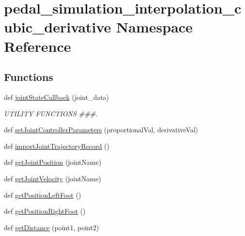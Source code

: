 \hypertarget{namespacepedal__simulation__interpolation__cubic__derivative}{}\section{pedal\+\_\+simulation\+\_\+interpolation\+\_\+cubic\+\_\+derivative Namespace Reference}
\label{namespacepedal__simulation__interpolation__cubic__derivative}
\subsection*{Functions}
\begin{DoxyCompactItemize}
\item 
def \mbox{\hyperlink{namespacepedal__simulation__interpolation__cubic__derivative_a8ba7e664349c21ee2d4c3b9ed4444863}{joint\+State\+Callback}} (joint\+\_\+data)
\begin{DoxyCompactList}\small\item\em U\+T\+I\+L\+I\+TY F\+U\+N\+C\+T\+I\+O\+NS \#\#\#. \end{DoxyCompactList}\item 
def \mbox{\hyperlink{namespacepedal__simulation__interpolation__cubic__derivative_a14a03067c9be857e5286ea14d3ea5e95}{set\+Joint\+Controller\+Parameters}} (proportional\+Val, derivative\+Val)
\item 
def \mbox{\hyperlink{namespacepedal__simulation__interpolation__cubic__derivative_a76e080940025a1563491de2d9879590c}{import\+Joint\+Trajectory\+Record}} ()
\item 
def \mbox{\hyperlink{namespacepedal__simulation__interpolation__cubic__derivative_a315fe4c5bd2622f2d56a0fc6c3c5e143}{get\+Joint\+Position}} (joint\+Name)
\item 
def \mbox{\hyperlink{namespacepedal__simulation__interpolation__cubic__derivative_a24deb6472cb7522ba7982e8b0d12a4cf}{get\+Joint\+Velocity}} (joint\+Name)
\item 
def \mbox{\hyperlink{namespacepedal__simulation__interpolation__cubic__derivative_af5b9d5c7d073c5699b72c7e341bccc95}{get\+Position\+Left\+Foot}} ()
\item 
def \mbox{\hyperlink{namespacepedal__simulation__interpolation__cubic__derivative_a9053f001263fc33a7c91b58ad1cab5ee}{get\+Position\+Right\+Foot}} ()
\item 
def \mbox{\hyperlink{namespacepedal__simulation__interpolation__cubic__derivative_a33404154e9fedd4c5bb116bcf60dfe70}{get\+Distance}} (point1, point2)

\end{DoxyCompactItemize}
